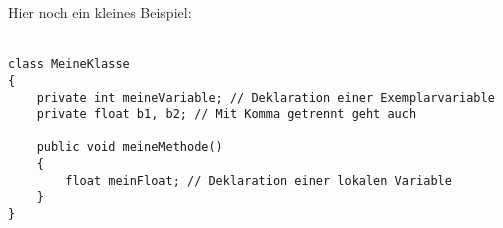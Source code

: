 \documentclass{article}
\begin{document}
	
		Hier noch ein kleines Beispiel:\\\\
		\begin{minipage}{\linewidth}
			\begin{lstlisting}[caption=Deklaration von Variablen]
class MeineKlasse
{
	private int meineVariable; // Deklaration einer Exemplarvariable
	private float b1, b2; // Mit Komma getrennt geht auch
	
	public void meineMethode()
	{
		float meinFloat; // Deklaration einer lokalen Variable
	}
}
			\end{lstlisting}
		\end{minipage}
\end{document}
